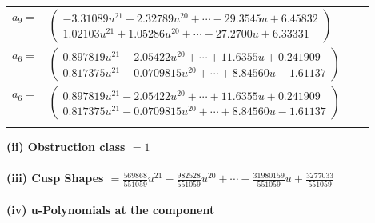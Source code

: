 \documentclass[1p]{elsarticle_modified}
\theoremstyle{definition}
\begin{document}
\begin{tabular}{m{7pt} m{180pt} m{7pt} m{180pt} }
\flushright $a_{9}=$&$\begin{pmatrix}-3.31089 u^{21}+2.32789 u^{20}+\cdots-29.3545 u+6.45832\\1.02103 u^{21}+1.05286 u^{20}+\cdots-27.2700 u+6.33331\end{pmatrix}$ \\
\flushright $a_{6}=$&$\begin{pmatrix}0.897819 u^{21}-2.05422 u^{20}+\cdots+11.6355 u+0.241909\\0.817375 u^{21}-0.0709815 u^{20}+\cdots+8.84560 u-1.61137\end{pmatrix}$\\ \flushright $a_{6}=$&$\begin{pmatrix}0.897819 u^{21}-2.05422 u^{20}+\cdots+11.6355 u+0.241909\\0.817375 u^{21}-0.0709815 u^{20}+\cdots+8.84560 u-1.61137\end{pmatrix}$\\&\end{tabular}
\flushleft \textbf{(ii) Obstruction class $= 1$}\\~\\
\flushleft \textbf{(iii) Cusp Shapes $= \frac{569868}{551059} u^{21}-\frac{982528}{551059} u^{20}+\cdots-\frac{31980159}{551059} u+\frac{3277033}{551059}$}\\~\\
\newpage\renewcommand{\arraystretch}{1}
\flushleft \textbf{(iv) u-Polynomials at the component}\newline \\
\end{document}
